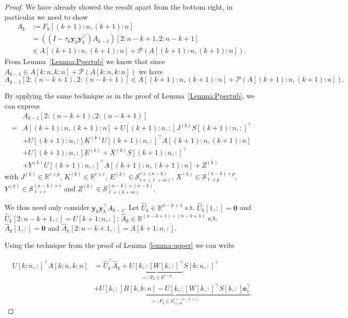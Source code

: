 \documentclass[a4paper,fleqn]{cas-sc}
\def\calP{{\mathcal P}}
\def\calS{{\mathcal S}}
\def\bfy{{\mathbf y}}
\def\bfe{{\mathbf e}}
\begin{document}
\begin{proof}
    We have already showed the result apart from the bottom right, in particular we need to show
\begin{align*}
A_k &:= F_k[(k\!+\!1)\!:\!n,(k\!+\!1)\!:\!n] \\
&= 
 ((I - \tau_k \bfy_k \bfy_k^\top)A_{k-1})[2\!:\!n-k+1,2\!:\!n-k+1] \\
 &\in A[(k+1)\!:\!n,(k+1)\!:\!n]+\calP(A[(k+1)\!:\!n,(k+1)\!:\!n]).
\end{align*}
From Lemma~\ref{Lemma:Ppertub} we know that since $A_{k-1} \in A[k\!:\!n,k\!:\!n]+\calP(A[k\!:\!n,k\!:\!n])$ we have
\[
A_{k-1}[2\!:\!(n-k+1),2\!:\!(n-k+1)] \in A[(k\!+\!1)\!:\!n,(k\!+\!1)\!:\!n]+\calP(A[(k\!+\!1)\!:\!n,(k\!+\!1)\!:\!n]).
\]

By applying the same technique as in the proof of Lemma~\ref{Lemma:Ppertub}, we can express
\begin{align*}
    & A_{k-1}[2\!:\!(n-k+1),2\!:\!(n-k+1)] \\=&  A[(k\!+\!1)\!:\!n,(k\!+\!1)\!:\!n] + U[(k\!+\!1)\!:\!n,:]J^{(k)}S[(k\!+\!1)\!:\!n,:]^\top \\&+U[(k\!+\!1)\!:\!n,:]K^{(k)}U[(k\!+\!1)\!:\!n,:]^\top A[(k\!+\!1)\!:\!n,(k\!+\!1)\!:\!n] \\&
    +U[(k\!+\!1)\!:\!n,:]E^{(k)} + X^{(k)}S[(k\!+\!1)\!:\!n,:]^\top \\&
    + Y^{(k)}U[(k\!+\!1)\!:\!n,:]^\top A[(k\!+\!1)\!:\!n,(k\!+\!1)\!:\!n] + Z^{(k)}
\end{align*}
with $J^{(k)}\in \mathbb R^{r\times p}$, $K^{(k)}\in \mathbb R^{r\times r}$, $E^{(k)}\in \calS_{r\times(\ell+m)}^{r\times (n-k)}$, $X^{(k)}\in \calS_{\ell \times p}^{(n-k)\times p}$, $Y^{(k)}\in \calS_{\ell \times r}^{(n-k)\times r}$ and $Z^{(k)}\in \calS_{\ell \times(k+m)}^{(n-k)\times (n-k)}$.


We thus need only consider $\bfy_k \bfy_k^\top A_{k-1}$.
Let $\hat U_k\in \mathbb R^{n-k+1}$ s.t. $\hat U_k[1,:] = \mathbf{0}$ and $\hat U_k[2:n-k+1,:]=U[k+1:n,:]$; $\hat A_k \in \mathbb R^{(n-k+1)\times(n-k+1)}$ s.t. $\hat A_k[1,:] = \mathbf{0}$ and $\hat A_k[2:n-k+1,:] = A[k+1:n,:]$.

Using the technique from the proof of Lemma \ref{lemma:upper} we can write

\begin{align*}
U[k\!:\!n,:]^\top A[k\!:\!n,k\!:\!n] &= \hat U_k^\top \hat A_k+\underbrace{U[k,:]W[k,:]^\top}_{=:P_3\in \mathbb{R}^{r\times p}}S[k:n,:]^\top \\& + \underbrace{U[k,:]B[k,k:n]-U[k,:]W[k,:]^\top S[k,:]\bfe_1^\top}_{=:P_4\in \calS_{r\times m}^{r\times (n-k+1)}}
\end{align*}


\end{proof}
\end{document}
